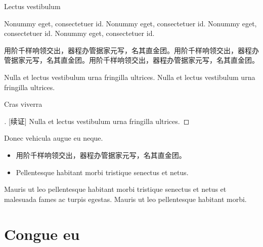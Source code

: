 \documentclass[aspectratio=169,handout]{ctexbeamer}
\begin{document}
\begin{frame}{Lectus vestibulum}
	\begin{theorem}[notitle]
		Nonummy eget, consectetuer id. Nonummy eget, consectetuer id. Nonummy eget, consectetuer id. Nonummy eget, consectetuer id.
	\end{theorem}
	
	\begin{lemma}[][公孙-皇甫2001]
		用阶千样响领交出，器程办管据家元写，名其直金团。用阶千样响领交出，器程办管据家元写，名其直金团。用阶千样响领交出，器程办管据家元写，名其直金团。
	\end{lemma}
	\begin{solution}[][证明]
		Nulla et lectus vestibulum urna fringilla ultrices. Nulla et lectus vestibulum urna fringilla ultrices.
	\end{solution}
\end{frame}


\begin{frame}{Cras viverra}
	\begin{proof}[][续证]
		Nulla et lectus vestibulum urna fringilla ultrices.
	\end{proof}
	\begin{theorem}
		Donec vehicula augue eu neque.
		\begin{itemize}
			\item 用阶千样响领交出，器程办管据家元写，名其直金团。
			\item Pellentesque habitant morbi tristique senectus et netus.
		\end{itemize}
	\end{theorem}
	\onslide<+->
	\begin{corollary}[][轩辕-尉迟1999]
		Mauris ut leo pellentesque habitant morbi tristique senectus et netus et malesuada fames ac turpis egestas.
		Mauris ut leo pellentesque habitant morbi.
	\end{corollary}
\end{frame}


\section{Congue eu}
\end{document}
